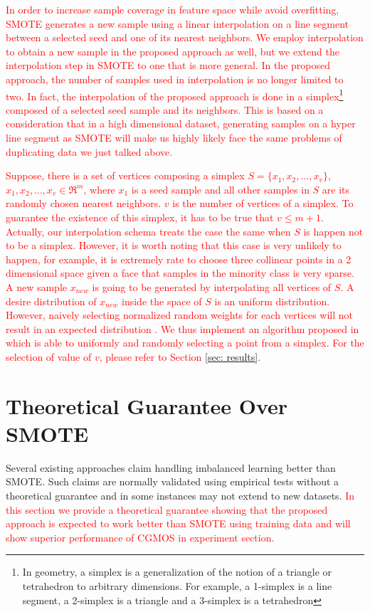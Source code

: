 \documentclass[10pt,journal,compsoc]{IEEEtran}
\begin{document}
\textcolor{red}{In order to increase sample coverage in feature space while avoid overfitting, SMOTE generates a new sample using a linear interpolation on a line segment between a selected seed and one of its nearest neighbors. We employ interpolation to obtain a new sample in the proposed approach as well, but we extend the interpolation step in SMOTE to one that is more general. In the proposed approach, the number of samples used in interpolation is no longer limited to two. In fact, the interpolation of the proposed approach is done in a simplex\footnote{In geometry, a simplex is a generalization of the notion of a triangle or tetrahedron to arbitrary dimensions. For example, a 1-simplex is a line segment, a 2-simplex is a triangle and a 3-simplex is a tetrahedron} composed of a selected seed sample and its neighbors. This is based on a consideration that in a high dimensional dataset, generating samples on a hyper line segment as SMOTE will make us highly likely face the same problems of duplicating data we just talked above.}  

\textcolor{red}{Suppose, there is a set of vertices composing a simplex $S=\{x_1, x_2, \dots, x_v\}$, $x_1, x_2, \dots, x_v \in \mathfrak{R}^m$, where $x_1$ is a seed sample and all other samples in $S$ are its randomly chosen nearest neighbors. $v$ is the number of vertices of a simplex. To guarantee the existence of this simplex, it has to be true that $v\leq m+1$. Actually, our interpolation schema treats the case the same when $S$ is happen not to be a simplex. However, it is worth noting that this case is very unlikely to happen, for example, it is extremely rate to choose three collinear points in a 2 dimensional space given a face that samples in the minority class is very sparse. A new sample $x_{new}$ is going to be generated by interpolating all vertices of $S$. A desire distribution of $x_{new}$ inside the space of $S$ is an uniform distribution. However, naively selecting normalized random weights for each vertices will not result in an expected distribution \cite{SNA:04}. We thus implement an algorithm proposed in \cite{SNA:04} which is able to uniformly and randomly selecting a point from a simplex. For the selection of value of $v$, please refer to Section \ref{sec: results}.}

\section{Theoretical Guarantee Over SMOTE}
Several existing approaches claim handling imbalanced learning better than SMOTE. Such claims are normally validated using empirical tests without a theoretical guarantee and in some instances may not extend to new datasets. \textcolor{red}{In this section we provide a theoretical guarantee showing that the proposed approach is expected to work better than SMOTE using training data and will show superior performance of CGMOS in experiment section.}
\end{document}
